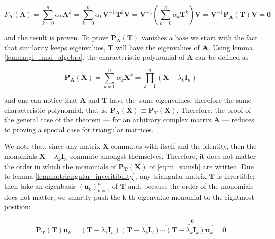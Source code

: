 \begin{equation} P_\mathbf{A}\left(\mathbf{A}\right) = \sum_{k=0}^n \alpha_k \mathbf{A}^k = \sum_{k=0}^n \alpha_k \mathbf{V}^{-1}\mathbf{T}^k\mathbf{V} = \mathbf{V}^{-1}\left(\sum_{k=0}^n \alpha_k \mathbf{T}^k\right)\mathbf{V} = \mathbf{V}^{-1}\mathbf{P_A}\left(\mathbf{T}\right)\mathbf{V} = \mathbf{0} \end{equation}

	\noindent and the result is proven. To prove $\mathbf{P}_\mathbf{A}\left(\mathbf{T}\right)$ vanishes a base we start with the fact that similarity keeps eigenvalues, $\mathbf{T}$ will have the eigenvalues of $\mathbf{A}$. Using lemma \ref{lemma:gl_fund_algebra}, the characteristic polynomial of $\mathbf{A}$ can be defined as 

\begin{equation} \mathbf{P_\mathbf{A}}\left(\mathbf{X}\right) = \sum_{k=0}^n \alpha_k \mathbf{X}^k = \prod_{k=1}^n \left(\mathbf{X} - \lambda_k\mathbf{I}_n\right)\label{eq:m_vanish}\end{equation}

	\noindent and one can notice that $\mathbf{A}$ and $\mathbf{T}$ have the same eigenvalues, therefore the same characteristic polynomial, that is, $\mathbf{P_A}\left(\mathbf{X}\right) \equiv \mathbf{P_T}\left(\mathbf{X}\right)$. Therefore, the proof of the general case of the theorem — for an arbitrary complex matrix $\mathbf{A}$ — reduces to proving a special case for triangular matrices.

	We note that, since any matrix $\mathbf{X}$ commutes with itself and the identity, then the monomials $\mathbf{X} - \lambda_k\mathbf{I}_n$ commute amongst themselves. Therefore, it does not matter the order in which the monomials of $\mathbf{P_T}\left(\mathbf{X}\right)$ of \eqref{eq:m_vanish} are written. Due to lemma \ref{lemma:triangular_inveritibility}, any triangular matrix $\mathbf{T}$ is invertible; then take an eigenbasis $\left(\mathbf{u}_k\right)_{k=1}^n$ of $\mathbf{T}$ and, because the order of the monomials does not matter, we smartly push the k-th eigenvalue monomial to the rightmost position:

\begin{equation} \mathbf{P_\mathbf{T}}\left(\mathbf{T}\right)\mathbf{u}_k  = \left(\mathbf{T} - \lambda_1\mathbf{I}_n\right)\left(\mathbf{T} - \lambda_k\mathbf{I}_2\right)\cdots\overbrace{\left(\mathbf{T} - \lambda_k\mathbf{I}_k\right)\mathbf{u}_k}^{=\mathbf{0}} = \mathbf{0} \end{equation}


